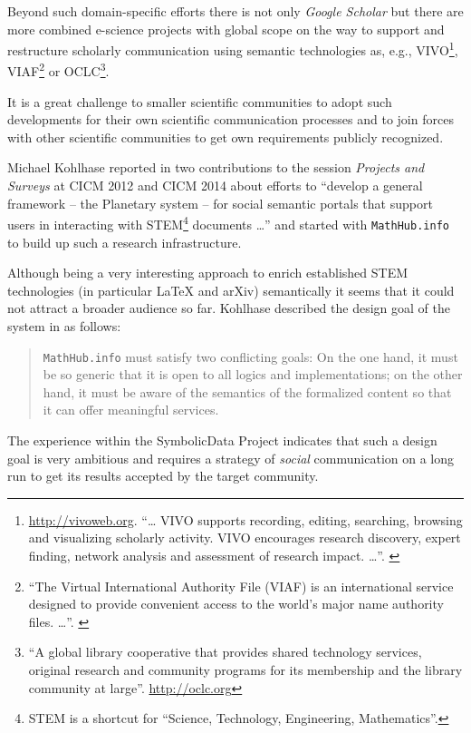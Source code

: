 \documentclass{llncs}
\newcommand{\SD}{{\sc Symbo\-lic\-Data}}
\begin{document}
Beyond such domain-specific efforts there is not only \emph{Google Scholar}
but there are more combined e-science projects with global scope on the way to
support and restructure scholarly communication using semantic technologies
as, e.g., VIVO\footnote{\url{http://vivoweb.org}. ``{\ldots} VIVO supports
  recording, editing, searching, browsing and visualizing scholarly
  activity. VIVO encourages research discovery, expert finding, network
  analysis and assessment of research impact.  {\ldots}''. \cite{vivo}},
VIAF\footnote{``The Virtual International Authority File (VIAF) is an
  international service designed to provide convenient access to the world's
  major name authority files.  {\ldots}''. \cite{viaf}} or OCLC\footnote{``A
  global library cooperative that provides shared technology services,
  original research and community programs for its membership and the library
  community at large''.  \url{http://oclc.org}}.

It is a great challenge to smaller scientific communities to adopt such
developments for their own scientific communication processes and to join
forces with other scientific communities to get own requirements publicly
recognized.  

Michael Kohlhase reported in two contributions \cite{planetary,mathhub} to the
session \emph{Projects and Surveys} at CICM 2012 and CICM 2014 about efforts
to ``develop a general framework -- the Planetary system -- for social
semantic portals that support users in interacting with STEM\footnote{STEM is
  a shortcut for ``Science, Technology, Engineering, Mathematics''.} documents
{\ldots}'' \cite{planetary} and started with \texttt{MathHub.info} to build up
such a research infrastructure.

Although being a very interesting approach to enrich established STEM
technologies (in particular {\LaTeX} and arXiv) semantically it seems that it
could not attract a broader audience so far.  Kohlhase described the design
goal of the system in \cite{mathhub} as follows:
\begin{quote}
  \texttt{MathHub.info} must satisfy two conflicting goals: On the one hand, it
  must be so generic that it is open to all logics and implementations; on the
  other hand, it must be aware of the semantics of the formalized content so
  that it can offer meaningful services. 
\end{quote}
The experience within the {\SD} Project indicates that such a design goal is
very ambitious and requires a strategy of \emph{social} communication on a
long run to get its results accepted by the target community.
\end{document}
